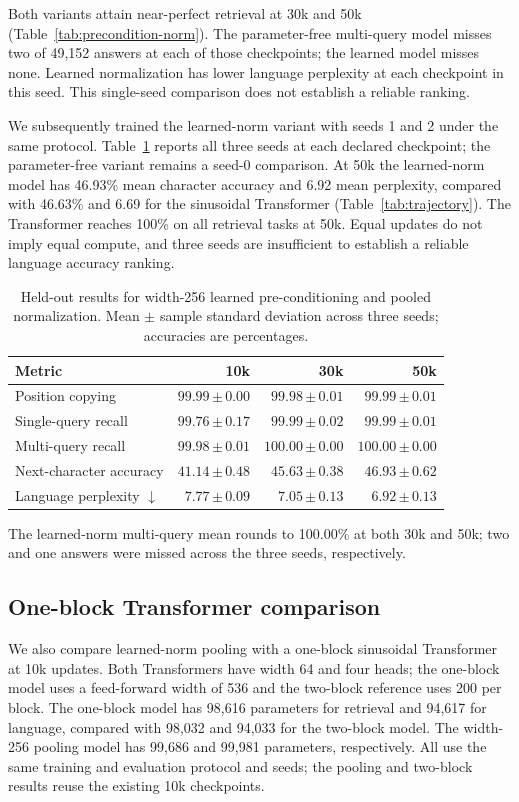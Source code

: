 \documentclass[11pt]{article}
\newcommand{\sd}[2]{#1\,{\scriptstyle\pm\,#2}}
\begin{document}
Both variants attain near-perfect retrieval at 30k and 50k
(Table~\ref{tab:precondition-norm}). The parameter-free multi-query model
misses two of 49,152 answers at each of those checkpoints; the learned model
misses none. Learned normalization has lower language perplexity at each
checkpoint in this seed. This single-seed comparison does not establish a
reliable ranking.

We subsequently trained the learned-norm variant with seeds 1 and 2 under the
same protocol. Table~\ref{tab:learned-norm-three-seed} reports all three seeds
at each declared checkpoint; the parameter-free variant remains a seed-0
comparison. At 50k the learned-norm model has 46.93\% mean character accuracy
and 6.92 mean perplexity, compared with 46.63\% and 6.69 for the sinusoidal
Transformer (Table~\ref{tab:trajectory}). The Transformer reaches 100\% on
all retrieval tasks at 50k. Equal updates do not imply equal compute, and three
seeds are insufficient to establish a reliable language accuracy ranking.

\begin{table}[htbp]
\centering\small
\caption{Held-out results for width-256 learned pre-conditioning and pooled
normalization. Mean \(\pm\) sample standard deviation across three seeds;
accuracies are percentages.}
\label{tab:learned-norm-three-seed}
\begin{tabular}{lrrr}
\toprule
Metric & 10k & 30k & 50k\\
\midrule
Position copying & \(\sd{99.99}{0.00}\) & \(\sd{99.98}{0.01}\) & \(\sd{99.99}{0.01}\)\\
Single-query recall & \(\sd{99.76}{0.17}\) & \(\sd{99.99}{0.02}\) & \(\sd{99.99}{0.01}\)\\
Multi-query recall & \(\sd{99.98}{0.01}\) & \(\sd{100.00}{0.00}\) & \(\sd{100.00}{0.00}\)\\
Next-character accuracy & \(\sd{41.14}{0.48}\) & \(\sd{45.63}{0.38}\) & \(\sd{46.93}{0.62}\)\\
Language perplexity \(\downarrow\) & \(\sd{7.77}{0.09}\) & \(\sd{7.05}{0.13}\) & \(\sd{6.92}{0.13}\)\\
\bottomrule
\end{tabular}
\end{table}

The learned-norm multi-query mean rounds to 100.00\% at both 30k and 50k;
two and one answers were missed across the three seeds, respectively.

\subsection{One-block Transformer comparison}
We also compare learned-norm pooling with a one-block sinusoidal Transformer
at 10k updates. Both Transformers have width 64 and four heads; the one-block
model uses a feed-forward width of 536 and the two-block reference uses 200
per block. The one-block model has 98,616 parameters for retrieval and 94,617
for language, compared with 98,032 and 94,033 for the two-block model. The
width-256 pooling model has 99,686 and 99,981 parameters, respectively.
All use the same training and evaluation protocol and seeds; the pooling and
two-block results reuse the existing 10k checkpoints.
\end{document}
